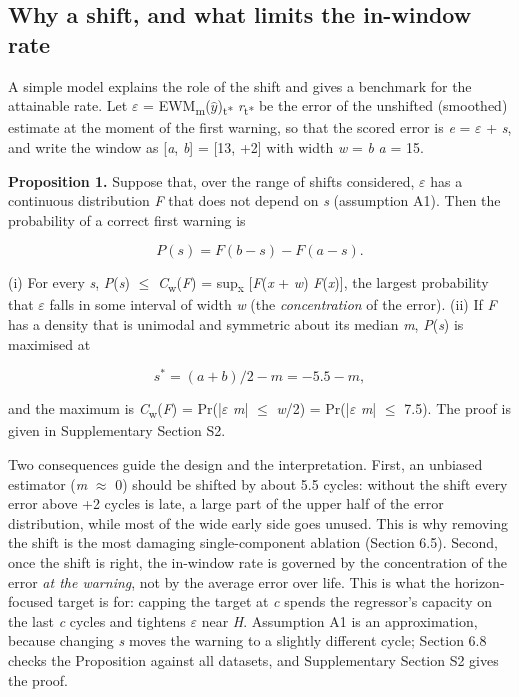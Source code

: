 \documentclass[a4paper,fleqn,doubleblind]{cas-dc}
\begin{document}
\subsection{Why a shift, and what limits the in-window rate}

A simple model explains the role of the shift and gives a benchmark for the attainable rate. Let $\varepsilon$ = EWM\textsubscript{m}($\hat{y}$)\textsubscript{t*} \textminus{} \textit{r}\textsubscript{t*} be the error of the unshifted (smoothed) estimate at the moment of the first warning, so that the scored error is \textit{e} = $\varepsilon$ + \textit{s}, and write the window as [\textit{a}, \textit{b}] = [\textminus{}13, +2] with width \textit{w} = \textit{b} \textminus{} \textit{a} = 15.

\textbf{Proposition 1.} Suppose that, over the range of shifts considered, $\varepsilon$ has a continuous distribution \textit{F} that does not depend on \textit{s} (assumption A1). Then the probability of a correct first warning is

\begin{equation}
P(s) = F(b - s) - F(a - s).
\end{equation}

(i) For every \textit{s}, \textit{P}(\textit{s}) $\le$ \textit{C}\textsubscript{w}(\textit{F}) = sup\textsubscript{x} [\textit{F}(\textit{x} + \textit{w}) \textminus{} \textit{F}(\textit{x})], the largest probability that $\varepsilon$ falls in some interval of width \textit{w} (the \textit{concentration} of the error). (ii) If \textit{F} has a density that is unimodal and symmetric about its median \textit{m}, \textit{P}(\textit{s}) is maximised at

\begin{equation}
s^{*} = (a + b)/2 - m = -5.5 - m,
\end{equation}

and the maximum is \textit{C}\textsubscript{w}(\textit{F}) = Pr(|$\varepsilon$ \textminus{} \textit{m}| $\le$ \textit{w}/2) = Pr(|$\varepsilon$ \textminus{} \textit{m}| $\le$ 7.5). The proof is given in Supplementary Section S2.

Two consequences guide the design and the interpretation. First, an unbiased estimator (\textit{m} $\approx$ 0) should be shifted by about \textminus{}5.5 cycles: without the shift every error above +2 cycles is late, a large part of the upper half of the error distribution, while most of the wide early side goes unused. This is why removing the shift is the most damaging single-component ablation (Section 6.5). Second, once the shift is right, the in-window rate is governed by the concentration of the error \textit{at the warning}, not by the average error over life. This is what the horizon-focused target is for: capping the target at \textit{c} spends the regressor's capacity on the last \textit{c} cycles and tightens $\varepsilon$ near \textit{H}. Assumption A1 is an approximation, because changing \textit{s} moves the warning to a slightly different cycle; Section 6.8 checks the Proposition against all datasets, and Supplementary Section S2 gives the proof.
\end{document}
